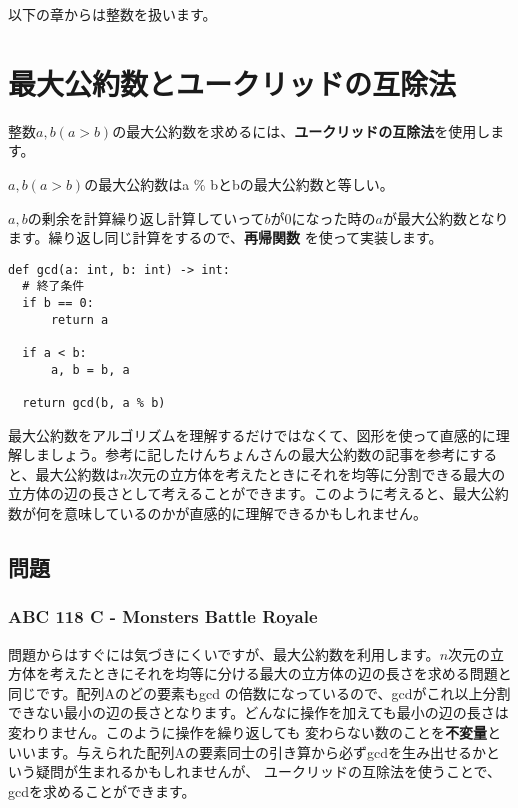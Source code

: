 \documentclass{jlreq}
\begin{document}
 
以下の章からは整数を扱います。

\section{最大公約数とユークリッドの互除法}

整数$a, b(a > b)$の最大公約数を求めるには、\textbf{ユークリッドの互除法}を使用します。

\begin{tcolorbox}[enhanced,title=ユークリッドの互除法, 
  attach boxed title to top left, 
  colback=white!95!blue,
  colbacktitle=white!10!blue!50!black,
  drop fuzzy shadow,
  boxrule=0.25mm,
  ]
  $a, b(a > b)$の最大公約数はa \% bとbの最大公約数と等しい。
\end{tcolorbox}

$a, b$の剰余を計算繰り返し計算していって$b$が0になった時の$a$が最大公約数となります。繰り返し同じ計算をするので、\textbf{再帰関数}
を使って実装します。

\begin{lstlisting}[caption=ユークリッドの互助法実装, frame=TRBL, label={euclid}]
def gcd(a: int, b: int) -> int:
  # 終了条件
  if b == 0:
      return a
  
  if a < b:
      a, b = b, a
      
  return gcd(b, a % b)
\end{lstlisting}

最大公約数をアルゴリズムを理解するだけではなくて、図形を使って直感的に理解しましょう。参考に記したけんちょんさんの最大公約数の記事を参考にすると、最大公約数は$n$次元の立方体を考えたときにそれを均等に分割できる最大の立方体の辺の長さとして考えることができます。このように考えると、最大公約数が何を意味しているのかが直感的に理解できるかもしれません。

\subsection{問題}
\subsubsection{ABC 118 C - Monsters Battle Royale}
問題からはすぐには気づきにくいですが、最大公約数を利用します。$n$次元の立方体を考えたときにそれを均等に分ける最大の立方体の辺の長さを求める問題と同じです。配列Aのどの要素もgcd
の倍数になっているので、gcdがこれ以上分割できない最小の辺の長さとなります。どんなに操作を加えても最小の辺の長さは変わりません。このように操作を繰り返しても
変わらない数のことを\textbf{不変量}といいます。与えられた配列Aの要素同士の引き算から必ずgcdを生み出せるかという疑問が生まれるかもしれませんが、
ユークリッドの互除法を使うことで、gcdを求めることができます。
\end{document}
